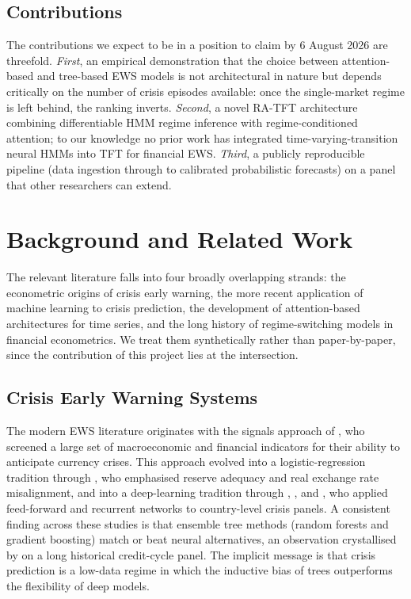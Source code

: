 \documentclass[11pt,a4paper]{article}
\begin{document}
\subsection{Contributions}
The contributions we expect to be in a position to claim by 6 August 2026 are
threefold. \emph{First}, an empirical demonstration that the choice between
attention-based and tree-based EWS models is not architectural in nature but
depends critically on the number of crisis episodes available: once the
single-market regime is left behind, the ranking inverts. \emph{Second}, a
novel RA-TFT architecture combining differentiable HMM regime inference
with regime-conditioned attention; to our knowledge no prior work has
integrated time-varying-transition neural HMMs into TFT for financial EWS.
\emph{Third}, a publicly reproducible pipeline (data ingestion through to
calibrated probabilistic forecasts) on a panel that other researchers can
extend.

\section{Background and Related Work}
\label{sec:background}

The relevant literature falls into four broadly overlapping strands: the
econometric origins of crisis early warning, the more recent application of
machine learning to crisis prediction, the development of attention-based
architectures for time series, and the long history of regime-switching
models in financial econometrics. We treat them synthetically rather than
paper-by-paper, since the contribution of this project lies at the
intersection.

\subsection{Crisis Early Warning Systems}
The modern EWS literature originates with the signals approach of
\citet{kaminsky1999leading}, who screened a large set of macroeconomic and
financial indicators for their ability to anticipate currency crises. This
approach evolved into a logistic-regression tradition through
\citet{frankelsaravelos2012}, who emphasised reserve adequacy and real
exchange rate misalignment, and into a deep-learning tradition through
\citet{beutel2019does}, \citet{holopainen2017toward}, and
\citet{chatzis2018forecasting}, who applied feed-forward and recurrent
networks to country-level crisis panels. A consistent finding across these
studies is that ensemble tree methods (random forests and gradient
boosting) match or beat neural alternatives, an observation crystallised
by \citet{bluwstein2023credit} on a long historical credit-cycle panel.
The implicit message is that crisis prediction is a low-data regime in which
the inductive bias of trees outperforms the flexibility of deep models.
\end{document}
